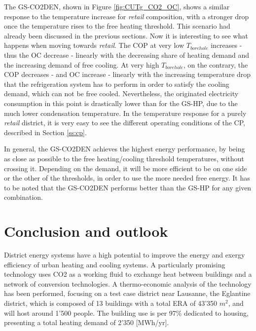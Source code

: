 \documentclass{article}
\begin{document}
The GS-CO2DEN, shown in Figure \ref{fig:CUTg_CO2_OC}, shows a similar response to the temperature increase for \textit{retail} composition, with a stronger drop once the temperature rises to the free heating threshold. This scenario had already been discussed in the previous sections. Now it is interesting to see what happens when moving towards \textit{retail}. The COP at very low $T_{borehole}$ increases - thus the OC decrease - linearly with the decreasing share of heating demand and the increasing demand of free cooling. At very high $T_{borehole}$, on the contrary, the COP decreases - and OC increase - linearly with the increasing temperature drop that the refrigeration system has to perform in order to satisfy the cooling demand, which can not be free cooled. Nevertheless, the originated electricity consumption in this point is drastically lower than for the GS-HP, due to the much lower condensation temperature. In the temperature response for a purely \textit{retail} district, it is very easy to see the different operating conditions of the CP, described in Section  \ref{ss:cp}. 

In general, the GS-CO2DEN achieves the highest energy performance, by being as close as possible to the free heating/cooling threshold temperatures, without crossing it. Depending on the demand, it will be more efficient to be on one side or the other of the thresholds, in order to use the more needed free energy. It has to be noted that the GS-CO2DEN performs better than the GS-HP for any given combination. 

\newpage
\section{Conclusion and outlook}
District energy systems have a high potential to improve the energy and exergy efficiency of urban heating and cooling systems. A particularly promising technology uses CO2 as a working fluid to exchange heat between buildings and a network of conversion technologies. A thermo-economic analysis of the technology has been performed, focusing on a test case district near Lausanne, the Eglantine district, which is composed of 13 buildings with a total ERA of  43'350 $m^2$, and will host around 1'500 people. The building use is per 97\% dedicated to housing, presenting a total heating demand of 2'350 [MWh/yr].
\end{document}
